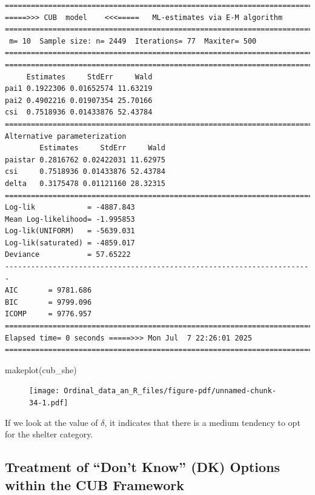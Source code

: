 \documentclass[
  letterpaper,
  DIV=11,
  numbers=noendperiod]{scrartcl}
\newenvironment{Shaded}{\begin{snugshade}}{\end{snugshade}}
\newcommand{\FunctionTok}[1]{\textcolor[rgb]{0.28,0.35,0.67}{#1}}
\newcommand{\NormalTok}[1]{\textcolor[rgb]{0.00,0.23,0.31}{#1}}
\begin{document}
\begin{verbatim}
======================================================================= 
=====>>> CUB  model    <<<=====   ML-estimates via E-M algorithm   
======================================================================= 
 m= 10  Sample size: n= 2449  Iterations= 77  Maxiter= 500 
======================================================================= 
======================================================================= 
     Estimates     StdErr     Wald
pai1 0.1922306 0.01652574 11.63219
pai2 0.4902216 0.01907354 25.70166
csi  0.7518936 0.01433876 52.43784
======================================================================= 
Alternative parameterization 
        Estimates     StdErr     Wald
paistar 0.2816762 0.02422031 11.62975
csi     0.7518936 0.01433876 52.43784
delta   0.3175478 0.01121160 28.32315
======================================================================= 
Log-lik            = -4887.843 
Mean Log-likelihood= -1.995853 
Log-lik(UNIFORM)   = -5639.031 
Log-lik(saturated) = -4859.017 
Deviance           = 57.65222 
----------------------------------------------------------------------- 
AIC       = 9781.686 
BIC       = 9799.096 
ICOMP     = 9776.957 
======================================================================= 
Elapsed time= 0 seconds =====>>> Mon Jul  7 22:26:01 2025 
======================================================================= 
\end{verbatim}

\begin{Shaded}
\begin{Highlighting}[]
\FunctionTok{makeplot}\NormalTok{(cub\_she)}
\end{Highlighting}
\end{Shaded}

\begin{figure}[H]

{\centering \texttt{[image: Ordinal\_data\_an\_R\_files/figure-pdf/unnamed-chunk-34-1.pdf]}

}

\end{figure}

If we look at the value of \(\delta\), it indicates that there is a
medium tendency to opt for the shelter category.

\hypertarget{treatment-of-dont-know-dk-options-within-the-cub-framework}{%
\subsection{Treatment of ``Don't Know'' (DK) Options within the CUB
Framework}\label{treatment-of-dont-know-dk-options-within-the-cub-framework}}
\end{document}
